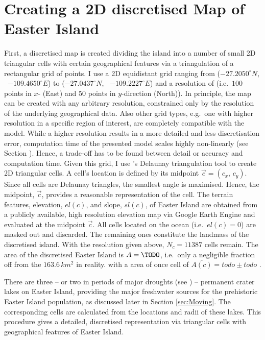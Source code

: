 \section{Creating a 2D discretised Map of Easter Island}

First, a discretised map is created dividing the island into a number of small 2D triangular cells with certain geographical features via a triangulation of a rectangular grid of points.
I use a 2D equidistant grid ranging from ($-27.2050^\circ N$, \, $-109.4650^\circ E$) to ($-27.0437^\circ N$, \, $-109.2227^\circ E$) and a resolution of (i.e.\ $100$ points in $x$- (East) and $50$ points in $y$-direction (North)). 
In principle, the map can be created with any arbitrary resolution, constrained only by the resolution of the underlying geographical data. 
Also other grid types, e.g.\ one with higher resolution in a specific region of interest, are completely compatible with the model. 
While a higher resolution results in a more detailed and less discretisation error, computation time of the presented model scales highly non-linearly (see Section \TODO).
Hence, a trade-off has to be found between detail or accuracy and computation time.
Given this grid, I use \citet{matplotlib}\TODO's Delaunay triangulation tool to create 2D triangular cells.
A cell's location is defined by its midpoint $\vec{c} = (c_x,\, c_y)$. 
Since all cells are Delaunay triangles, the smallest angle is maximised. 
Hence, the midpoint, $\vec{c}$, provides a reasonable representation of the cell.
The terrain features, elevation, $el(c)$, and slope, $sl(c)$, of Easter Island are obtained from a publicly available, high resolution elevation map \citep{Jarvis2008CIGAR} via Google Earth Engine \citep{gorelick2017google} and evaluated at the midpoint $\vec{c}$.
All cells located on the ocean (i.e.\ $el(c)=0$) are masked out and discarded.
The remaining ones constitute the landmass of the discretised island. 
With the resolution given above, $N_c = 11387$ cells remain. 
The area of the discretised Easter Island is $A=\TODO$, i.e.\ only a negligible fraction off from the $163.6\, {km^2}$ in reality.
with a area of once cell of $\overline{A(c)}= todo \pm todo$ \TODO.  

There are three -- or two in periods of major droughts (see \citet{Rull2020}) -- permanent crater lakes on Easter Island, providing the major freshwater sources for the prehistoric Easter Island population, as discussed later in Section \ref{sec:Moving}.
The corresponding cells are calculated from the locations and radii of these lakes. 
This procedure gives a detailed, discretised representation via triangular cells with geographical features of Easter Island. 
 

